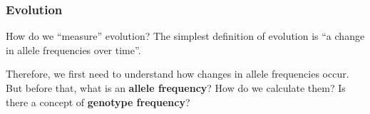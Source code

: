 \documentclass{beamer}
\newcommand{\1}{\ensuremath{\mathbf{1}}}
\begin{document}
%
%
%
\begin{frame}\frametitle{Evolution}
	\begin{block}{How do we ``measure'' evolution?}
		The simplest definition of evolution is ``a change in allele frequencies over time''.
	\end{block}
	Therefore, we first need to understand how changes in allele frequencies occur.\\[2ex]
	But before that, what is an \textbf{allele frequency}? How do we calculate them? Is there a concept of \textbf{genotype frequency}?
\end{frame}
%
%
%
\end{document}
